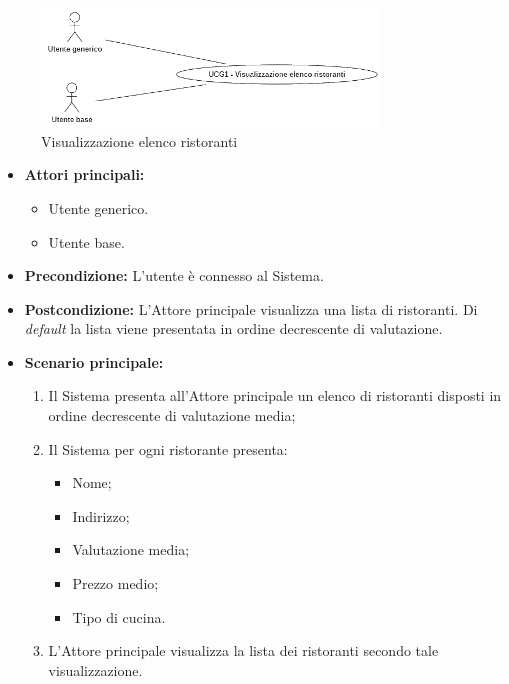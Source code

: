 
\label{usecase:Visualizzazione elenco ristoranti}

\begin{figure}[h]
	\centering
	\includegraphics[width=0.8\textwidth]{./uml/UCG1.png} 
	\caption{Visualizzazione elenco ristoranti}
	\label{fig:UCG1}
  \end{figure}

\begin{itemize}
	\item \textbf{Attori principali:} 
	\begin{itemize}
		\item Utente generico.
		\item Utente base.
	\end{itemize}

	\item \textbf{Precondizione:}
	      L'utente è connesso al Sistema.

	\item \textbf{Postcondizione:} L'Attore principale visualizza una lista di
	      ristoranti. Di \textit{default} la lista viene presentata in ordine decrescente di valutazione.

	\item \textbf{Scenario principale:}
	      \begin{enumerate}

		      \item Il Sistema presenta all'Attore principale un elenco di ristoranti disposti in ordine decrescente di valutazione media;
		      \item Il Sistema per ogni ristorante presenta:
		            \begin{itemize}
			            \item Nome;
			            \item Indirizzo;
			            \item Valutazione media;
			            \item Prezzo medio;
			            \item Tipo di cucina.
		            \end{itemize}

		      \item L'Attore principale visualizza la lista dei ristoranti secondo tale visualizzazione.

	      \end{enumerate}
\end{itemize}
